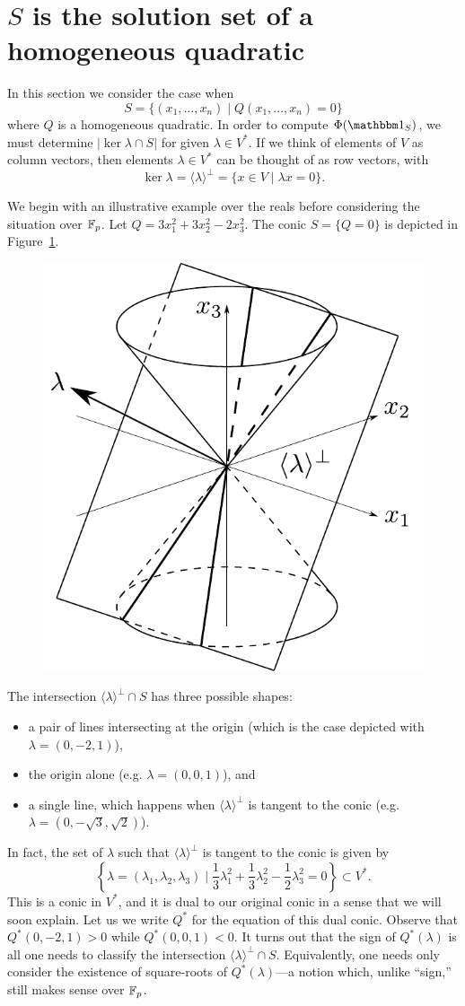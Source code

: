 \section{$S$ is the solution set of a homogeneous quadratic}\label{sec:partb}
In this section we consider the case when
\[
	S = \{(x_1,\ldots,x_n) \mid Q(x_1,\ldots,x_n) = 0\}
\]
where $Q$ is a homogeneous quadratic. In order to compute $\Phi(\IND_S)$, we must determine $|\ker \lambda \cap S|$ for given $\lambda \in V^*$. If we think of elements of $V$ as column vectors, then elements $\lambda \in V^*$ can be thought of as row vectors, with
\[
	\ker \lambda = \langle \lambda \rangle^\bot = \{x \in V \mid \lambda x =0\}.
\]

We begin with an illustrative example over the reals before considering the situation over $\mathbb{F}_p$. Let $Q = 3x_1^2 + 3x_2^2 - 2x_3^2$. The conic $S = \{Q = 0\}$ is depicted in Figure~\ref{fig:conic-with-plane}.
\begin{figure}[h]
	\centering
	\includegraphics[width=0.6\linewidth]{conic-with-plane}
	\caption{}
	\label{fig:conic-with-plane}
\end{figure}
The intersection $\langle \lambda \rangle^\bot \cap S$ has three possible shapes:
\begin{itemize}
	\item a pair of lines intersecting at the origin (which is the case depicted with $\lambda = (0,-2,1)$),
	\item the origin alone (e.g. $\lambda = (0,0,1)$), and
	\item a single line, which happens when $\langle \lambda \rangle^\bot$ is tangent to the conic (e.g. $\lambda = (0,-\sqrt{3},\sqrt{2})$).
\end{itemize}
In fact, the set of $\lambda$ such that $\langle \lambda \rangle^\bot$ is tangent to the conic is given by
\[
	\left\{ \lambda = (\lambda_1,\lambda_2,\lambda_3) \mid \frac{1}{3} \lambda_1^2 + \frac{1}{3} \lambda_2^2 - \frac{1}{2} \lambda_3^2 = 0 \right\} \subset V^*.
\]
This is a conic in $V^*$, and it is dual to our original conic in a sense that we will soon explain. Let us we write $Q^*$ for the equation of this dual conic. Observe that $Q^*(0,-2,1) > 0$ while $Q^*(0,0,1) < 0$. It turns out that the sign of $Q^*(\lambda)$ is all one needs to classify the intersection $\langle \lambda \rangle^\bot \cap S$. Equivalently, one needs only consider the existence of square-roots of $Q^*(\lambda)$---a notion which, unlike ``sign,'' still makes sense over $\mathbb{F}_p$.

